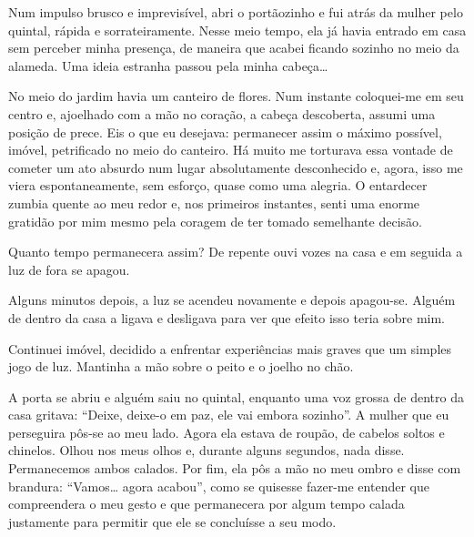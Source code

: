 Num impulso brusco e imprevisível, abri o portãozinho e fui atrás da mulher
pelo quintal, rápida e sorrateiramente. Nesse meio tempo, ela já havia
entrado em casa sem perceber minha presença, de maneira que acabei ficando
sozinho no meio da alameda. Uma ideia estranha passou pela minha cabeça\ldots
{}

No meio do jardim havia um canteiro de flores. Num instante coloquei-me em seu
centro e, ajoelhado com a mão no coração, a cabeça descoberta, assumi uma
posição de prece. Eis o que eu desejava: permanecer assim o máximo possível,
imóvel, petrificado no meio do canteiro. Há muito me torturava essa vontade
de cometer um ato absurdo num lugar absolutamente desconhecido e, agora, isso
me viera espontaneamente, sem esforço, quase como uma alegria. O entardecer
zumbia quente ao meu redor e, nos primeiros instantes, senti uma enorme
gratidão por mim mesmo pela coragem de ter tomado semelhante decisão.


Quanto tempo permanecera assim? De repente ouvi vozes na casa e em seguida a
luz de fora se apagou.


Alguns minutos depois, a luz se acendeu novamente e depois apagou-se. Alguém
de dentro da casa a ligava e desligava para ver que efeito isso teria sobre
mim.

Continuei imóvel, decidido a enfrentar experiências mais graves que um simples
jogo de luz. Mantinha a mão sobre o peito e o joelho no chão.

A porta se abriu e alguém saiu no quintal, enquanto uma voz grossa de dentro
da casa gritava: ``Deixe, deixe-o em paz, ele vai embora sozinho''. A mulher
que eu perseguira pôs-se ao meu lado. Agora ela estava de roupão, de cabelos
soltos e chinelos. Olhou nos meus olhos e, durante alguns segundos, nada
disse. Permanecemos ambos calados. Por fim, ela pôs a mão no meu ombro e
disse com brandura: ``Vamos\ldots{} agora acabou'', como se quisesse fazer-me
entender que compreendera o meu gesto e que permanecera por algum tempo
calada justamente para permitir que ele se concluísse a seu modo.

